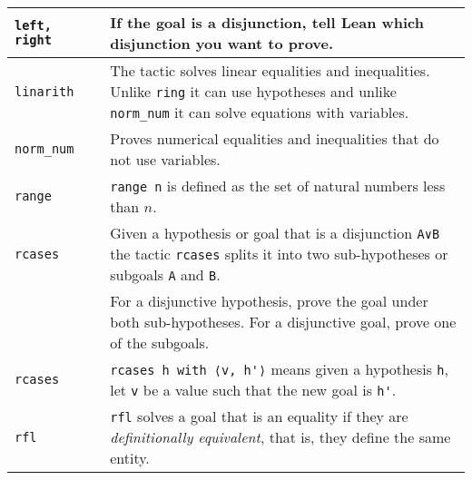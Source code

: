 \begin{tabular}{p{}|r|p{}}
\Verb+left, right+ &\pageref{p.left-right}& If the goal is a disjunction, tell Lean which disjunction you want to prove.\\\hline

\Verb+linarith+&\pageref{p.linarith}&The tactic solves linear equalities and inequalities. Unlike \Verb+ring+ it can use hypotheses and unlike \Verb+norm_num+ it can solve equations with variables.\\\hline

\Verb+norm_num+&\pageref{p.norm-num}&Proves numerical equalities and inequalities that do not use variables.\\\hline

\Verb+range+&\pageref{p.range}&\Verb+range n+ is defined as the set of natural numbers less than $n$.\\\hline

\Verb+rcases+&\pageref{p.rcases}&Given a hypothesis or goal that is a disjunction \Verb+A∨B+ the tactic \Verb+rcases+ splits it into two sub-hypotheses or subgoals \Verb+A+ and \Verb+B+.\\
&&For a disjunctive hypothesis, prove the goal under both sub-hypotheses. For a disjunctive goal, prove one of the subgoals.\\\hline

\Verb+rcases+&\pageref{p.rcases-with}&\Verb+rcases h with ⟨v, h'⟩+ means given a hypothesis \Verb+h+, let \Verb+v+ be a value such that the new goal is \Verb+h'+.\\\hline

\Verb+rfl+&\pageref{p.rfl}&\Verb+rfl+ solves a goal that is an equality if they are \emph{definitionally equivalent}, that is, they define the same entity.\\\hline

\end{tabular}


